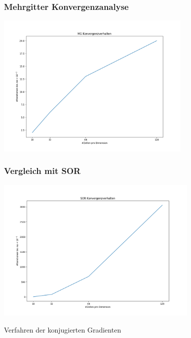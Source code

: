 \documentclass[]{beamer}
\begin{document}
\begin{frame}
  \frametitle{Mehrgitter Konvergenzanalyse}
  \begin{center}
    \includegraphics[width=0.9\linewidth, height=7cm]{mg_konvergenzverhalten.png}
  \end{center}
\end{frame}

\begin{frame}
  \frametitle{Vergleich mit SOR}
  \begin{center}
    \includegraphics[width=0.9\linewidth, height=7cm]{mg_vs_sor.png}
  \end{center}
\end{frame}


\begin{frame}
\begin{center}
 \Large Verfahren der konjugierten Gradienten
 \end{center}
\end{frame}
\end{document}
